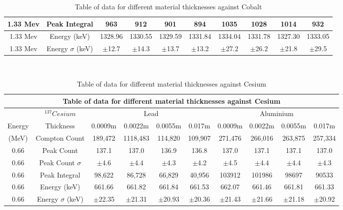 \documentclass[12pt]{article}
\begin{document}
\begin{table}[H]
\begin{center}
\begin{tabular}{|c||c||c|c|c|c||c|c|c|c|}
 \hline
 1.33 Mev & Peak Integral & 963 & 912 & 901 & 894 & 1035 & 1028 & 1014 & 932 \\
 \hline
 1.33 Mev & Energy (keV) & 1328.96 & 1330.55 & 1329.59 & 1331.84 & 1334.04 & 1331.78 & 1327.30 & 1333.05 \\
 \hline
 1.33 Mev & Energy $\sigma$ (keV) & $\pm$12.7 & $\pm$14.3 & $\pm$13.7 & $\pm$13.2 & $\pm$27.2 & $\pm$26.2 & $\pm$21.8 & $\pm$29.5 \\
 \hline
 \end{tabular} \\ 
 \caption{Table of data for different material thicknesses against Cobalt}
 \label{Cobalt Data}
\end{center}
\end{table} 

\begin{table}[H]
\begin{center}
 \footnotesize
 \begin{tabular}{|c||c||c|c|c|c||c|c|c|c|}
 \hline
 \multicolumn{10}{|c|}{Table of data for different material thicknesses against Cesium} \\
 \hline \hline
 \multicolumn{1}{|c||}{} & \multicolumn{1}{|c||}{$^{137}Cesium$} & \multicolumn{4}{|c||}{Lead} & \multicolumn{4}{c|}{Aluminium} \\
 \hline
  Energy & Thickness & 0.0009m & 0.0022m & 0.0055m & 0.017m & 0.0009m & 0.0022m & 0.0055m & 0.017m\\
 \hline \hline
  (MeV) & Compton Count & 189,472 & 1118,483 & 114,820 & 109,907 & 271,476 & 266,016 & 263,875 & 257,334 \\
 \hline \hline
 0.66 & Peak Count & 137.1 & 137.0 & 136.9 & 136.8 & 137.0 & 137.1 & 137.1 & 137.0 \\
 \hline
 0.66 & Peak Count $\sigma$ & $\pm$4.6 & $\pm$4.4 & $\pm$4.3 & $\pm$4.2 & $\pm$4.5 & $\pm$4.4 & $\pm$4.4 & $\pm$4.3 \\
 \hline
 0.66 & Peak Integral & 98,622 & 86,728 & 66,829 & 40,956 & 103912 & 101986 & 98697 & 90533 \\
 \hline
 0.66 & Energy (keV) & 661.66 & 661.82 & 661.84 & 661.53 & 662.07 & 661.46 & 661.81 & 661.33 \\
 \hline
 0.66 & Energy $\sigma$ (keV) & $\pm$22.35 & $\pm$21.31 & $\pm$20.93 & $\pm$20.36 & $\pm$21.43 & $\pm$21.66 & $\pm$21.18 & $\pm$20.92 \\
 \hline
 \end{tabular} \\ 
 \caption{Table of data for different material thicknesses against Cesium}
 \label{Cobalt Data}
\end{center}
\end{table}
\end{document}
